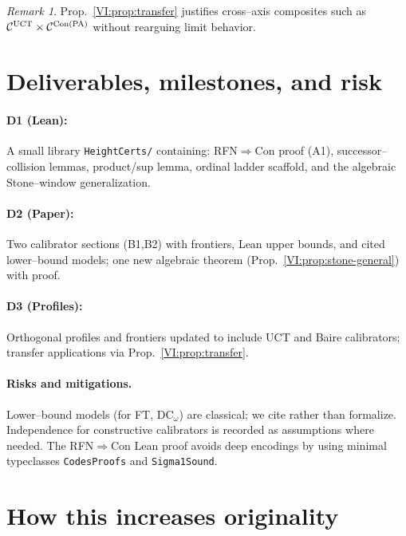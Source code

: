 \documentclass[11pt]{article}
\theoremstyle{definition}
\theoremstyle{remark}
\newtheorem{remark}[theorem]{Remark}
\newcommand{\DCw}{\mathrm{DC}_\omega}
\begin{document}
\begin{remark}
Prop.~\ref{VI:prop:transfer} justifies cross–axis composites such as \(\mathcal C^{\mathrm{UCT}}\times \mathcal C^{\mathrm{Con}(\mathrm{PA})}\) without rearguing limit behavior.
\end{remark}

\section{Deliverables, milestones, and risk}

\paragraph{D1 (Lean):} A small library \texttt{HeightCerts/} containing:
RFN\(\Rightarrow\)Con proof (A1), successor–collision lemmas, product/sup lemma, ordinal ladder scaffold, and the algebraic Stone–window generalization.

\paragraph{D2 (Paper):} Two calibrator sections (B1,B2) with frontiers, Lean upper bounds, and cited lower–bound models; one new algebraic theorem (Prop.~\ref{VI:prop:stone-general}) with proof.

\paragraph{D3 (Profiles):} Orthogonal profiles and frontiers updated to include UCT and Baire calibrators; transfer applications via Prop.~\ref{VI:prop:transfer}.

\paragraph{Risks and mitigations.}
Lower–bound models (for FT, \(\DCw\)) are classical; we cite rather than formalize. Independence for constructive calibrators is recorded as assumptions where needed. The RFN\(\Rightarrow\)Con Lean proof avoids deep encodings by using minimal typeclasses \texttt{CodesProofs} and \texttt{Sigma1Sound}.

\section{How this increases originality}
\end{document}
